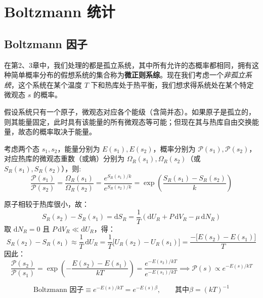 \chapter{Boltzmann 统计}

\section{Boltzmann 因子}
在第2、3章中，我们处理的都是孤立系统，其中所有允许的态概率都相同，拥有这种简单概率分布的假想系统的集合称为\textbf{微正则系综}。现在我们考虑一个\textit{非孤立系统}，这个系统在某个温度 $T$ 下和热库处于热平衡，我们想求得系统处在某个特定微观态 $s$ 的概率。

假设系统只有一个原子，微观态对应各个能级（含简并态）。如果原子是孤立的，则其能量固定，此时具有该能量的所有微观态等可能；但现在其与热库自由交换能量，故态的概率取决于能量。

考虑两个态 $s_1,s_2$，能量分别为 $E(s_1),E(s_2)$，概率分别为 $\mathcal{P}(s_1),\mathcal{P}(s_2)$，对应热库的微观态重数（或熵）分别为 $\Omega_R(s_1),\Omega_R(s_2)$（或 $S_R(s_1),S_R(s_2)$），则:
\begin{equation}
    \frac{\mathcal{P}(s_1)}{\mathcal{P}(s_2)}
    =\frac{\Omega_R(s_1)}{\Omega_R(s_2)}
    =\frac{e^{S_R(s_1)/k}}{e^{S_R(s_2)/k}}
    =\exp\!\left(\frac{S_R(s_1)-S_R(s_2)}{k}\right)
\end{equation}

原子相较于热库很小，故：
\begin{equation}\label{eq:deltaS}
    S_R(s_2)-S_R(s_1)=\mathrm{d}S_R
    =\frac{1}{T}\left(\mathrm{d}U_R+P\,\mathrm{d}V_R-\mu\,\mathrm{d}N_R\right)
\end{equation}
取 $\mathrm{d}N_R=0$ 且 $P\,\mathrm{d}V_R\ll \mathrm{d}U_R$，得：
\begin{equation}
    S_R(s_2)-S_R(s_1)
    \approx \frac{1}{T}\,\mathrm{d}U_R
    =\frac{1}{T}\bigl[U_R(s_2)-U_R(s_1)\bigr]
    =\frac{-\bigl[E(s_2)-E(s_1)\bigr]}{T}
\end{equation}
因此：
\begin{equation}
    \frac{\mathcal{P}(s_2)}{\mathcal{P}(s_1)}
    =\exp\!\left(-\frac{E(s_2)-E(s_1)}{kT}\right)
    =\frac{e^{-E(s_2)/kT}}{e^{-E(s_1)/kT}}
    \implies \mathcal{P}(s)\propto e^{-E(s)/kT}
\end{equation}

\begin{definition}[Boltzmann 因子]
    \begin{equation}
        \text{Boltzmann 因子} \equiv e^{-E(s)/kT} = e^{-E(s)\beta},\qquad \text{其中} \beta = (kT)^{-1}
    \end{equation}
\end{definition}

